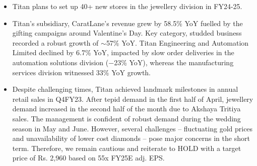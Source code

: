 \begin{itemize}
  \item Titan plans to set up 40+ new stores in the jewellery division in FY24-25.
  \item Titan's subsidiary, CaratLane's revenue grew by 58.5\% YoY fuelled by the gifting campaigns around Valentine's Day. Key category, studded business recorded a robust growth of $\sim$57\% YoY. Titan Engineering and Automation Limited declined by 6.7\% YoY, impacted by slow order deliveries in the automation solutions division ($-$23\% YoY), whereas the manufacturing services division witnessed 33\% YoY growth.
  \item Despite challenging times, Titan achieved landmark milestones in annual retail sales in Q4FY23. After tepid demand in the first half of April, jewellery demand increased in the second half of the month due to Akshaya Tritiya sales. The management is confident of robust demand during the wedding season in May and June. However, several challenges – fluctuating gold prices and unavailability of lower cost diamonds – pose major concerns in the short term. Therefore, we remain cautious and reiterate to HOLD with a target price of Rs. 2,960 based on 55x FY25E adj. EPS.
\end{itemize}

